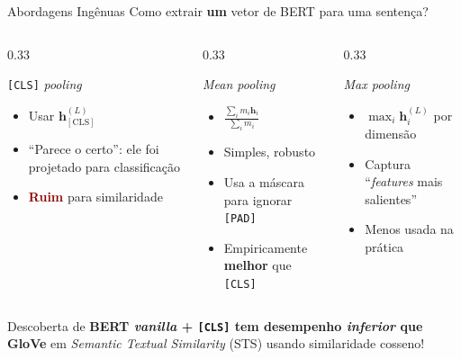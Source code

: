 \documentclass[aspectratio=169, xcolor=dvipsnames]{beamer}
\begin{document}
  \begin{frame}{Abordagens Ingênuas}
    Como extrair \textbf{um} vetor de BERT para uma sentença?
    \vspace{0.4em}
    \begin{columns}[T]
      \begin{column}{0.33\textwidth}
        \begin{block}{\texttt{[CLS]} \textit{pooling}}
          \begin{itemize}
            \item Usar $\mathbf{h}_{[\text{CLS}]}^{(L)}$
            \item ``Parece o certo'': ele foi projetado para classificação
            \item \textcolor{DarkRed}{\textbf{Ruim}} para similaridade
          \end{itemize}
        \end{block}
      \end{column}
      \begin{column}{0.33\textwidth}
        \begin{block}{\textit{Mean pooling}}
          \begin{itemize}
            \item $\frac{\sum_i m_i\mathbf h_i}{\sum_i m_i}$
            \item Simples, robusto
            \item Usa a máscara para ignorar \texttt{[PAD]}
            \item Empiricamente \textbf{melhor} que \texttt{[CLS]}
          \end{itemize}
        \end{block}
      \end{column}
      \begin{column}{0.33\textwidth}
        \begin{block}{\textit{Max pooling}}
          \begin{itemize}
            \item $\max_i \mathbf{h}_i^{(L)}$ por dimensão
            \item Captura ``\textit{features} mais salientes''
            \item Menos usada na prática
          \end{itemize}
        \end{block}
      \end{column}
    \end{columns}
    \vspace{0.3em}
    \begin{alertblock}{Descoberta de \cite{reimers2019sbert}}
      \textbf{BERT \textit{vanilla} + \texttt{[CLS]} tem desempenho \textit{inferior} que GloVe} em \textit{Semantic Textual Similarity} (STS) usando similaridade cosseno!
    \end{alertblock}
  \end{frame}
\end{document}
